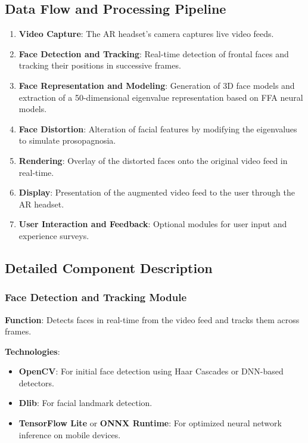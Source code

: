 \documentclass{article}
\begin{document}
\subsection{Data Flow and Processing Pipeline}

\begin{enumerate}
    \item \textbf{Video Capture}: The AR headset's camera captures live video feeds.
    \item \textbf{Face Detection and Tracking}: Real-time detection of frontal faces and tracking their positions in successive frames.
    \item \textbf{Face Representation and Modeling}: Generation of 3D face models and extraction of a 50-dimensional eigenvalue representation based on FFA neural models.
    \item \textbf{Face Distortion}: Alteration of facial features by modifying the eigenvalues to simulate prosopagnosia.
    \item \textbf{Rendering}: Overlay of the distorted faces onto the original video feed in real-time.
    \item \textbf{Display}: Presentation of the augmented video feed to the user through the AR headset.
    \item \textbf{User Interaction and Feedback}: Optional modules for user input and experience surveys.
\end{enumerate}

\subsection{Detailed Component Description}

\subsubsection{Face Detection and Tracking Module}

\textbf{Function}: Detects faces in real-time from the video feed and tracks them across frames.

\textbf{Technologies}:
\begin{itemize}
    \item \textbf{OpenCV}: For initial face detection using Haar Cascades or DNN-based detectors.
    \item \textbf{Dlib}: For facial landmark detection.
    \item \textbf{TensorFlow Lite} or \textbf{ONNX Runtime}: For optimized neural network inference on mobile devices.
\end{itemize}
\end{document}
